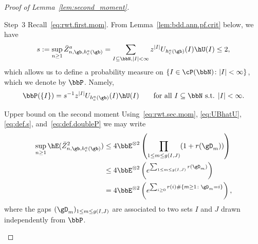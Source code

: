 \begin{proof}[Proof of Lemma~\ref{lem:second_moment}]
\begin{step}{Step~3}
Recall~\eqref{eq:rwt.first.mom}. From Lemma~\ref{lem:bdd.ann.pf.crit} below, we have
\begin{equation}\label{eq:def.s}
s := \sup_{n \geq 1} \bar Z^a_{n,\gb,h_c^a(\gb)} = \sum_{I \subseteq \bbN, |I| < \infty} z^{|I|} U_{h_c^a(\gb)}(I) \hU(I) \leq 2,
\end{equation}
which allows us to define a probability measure on $\{I\in\cP(\bbN)\colon |I|<\infty\}$, which we denote by $ \bbP$. Namely,
\begin{equation}\label{eq:def.doubleP}
\bbP(\{I\}) = s^{-1} z^{|I|} U_{h_c^a(\gb)}(I) \hU(I) \qquad \text{for all $I \subseteq \bbN$ s.t. } |I| < \infty.
\end{equation}

\begin{step}{Upper bound on the second moment}
Using~\eqref{eq:rwt.sec.mom}, \eqref{eq:UBhatU}, \eqref{eq:def.s}, and~\eqref{eq:def.doubleP} we may write
\begin{equation}\label{eq:UB.sec.mom}
\begin{aligned}
\sup_{n \geq 1} \hE(\bar Z_{n,\gb,h_c^a(\gb)}^2) &\leq 4 \bbE^{\otimes 2} \left(\prod_{1 \leq m \leq g(I,J)} (1 + r(\gD_m)) \right)\\
&\leq 4 \bbE^{\otimes 2} \left(e^{\sum_{1 \leq m \leq g(I,J)} r(\gD_m)} \right)\\
&= 4 \bbE^{\otimes 2} \left(e^{\sum_{i \geq 0} r(i) \#\{m \geq 1 \colon \gD_m = i\}} \right),
\end{aligned}
\end{equation}
where the gaps $(\gD_m)_{1 \leq m \leq g(I,J)}$ are associated to two sets $I$ and $J$ drawn in\-depend\-ently from $\bbP$.
\end{step}
\end{step}


\end{proof}
